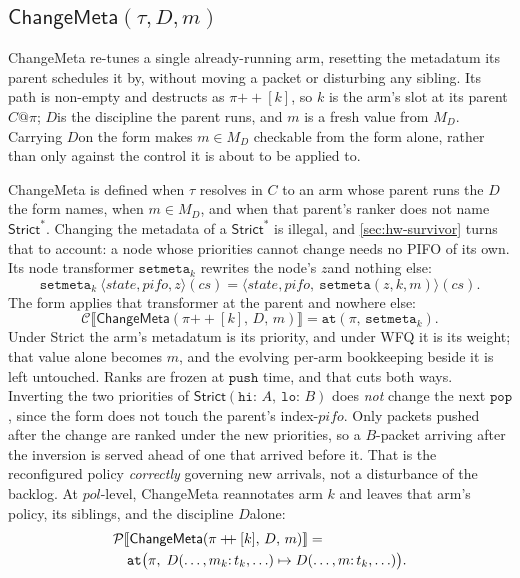 \documentclass[sigplan,anonymous,review,nonacm]{acmart}
\newcommand{\push}{\ensuremath{\mathtt{push}}}
\newcommand{\pop}{\ensuremath{\mathtt{pop}}}
\newcommand{\csem}[1]{\mathcal{C}\llbracket #1 \rrbracket}
\newcommand{\psem}[1]{\mathcal{P}\llbracket #1 \rrbracket}
\newcommand{\notation}[1]{\ensuremath{#1}\ifmmode\else\xspace\fi}
\newcommand{\pol}{\notation{\mathit{pol}}}
\newcommand{\pifo}{\notation{\mathit{pifo}}}
\newcommand{\zz}{\notation{\mathit{z}}}
\newcommand{\disc}{\notation{D}}
\newcommand{\Strict}{\textsf{Strict}}
\newcommand{\Strictstar}{\textsf{Strict}^{*}}
\newcommand{\WFQ}{\textsf{WFQ}}
\newcommand{\ChangeMeta}{\textsf{ChangeMeta}}
\begin{document}
\subsection{\texorpdfstring{\(\ChangeMeta(\tau, D, m)\)}{ChangeMeta}}\label{sec:changemeta}


\ChangeMeta{} re-tunes a single already-running arm, resetting the metadatum its parent schedules it by, without moving a packet or disturbing any sibling.
Its path is non-empty and destructs as \(\pi \mathbin{+\!\!+} [k]\), so \(k\) is the arm's slot at its parent \(C@\pi\); \disc is the discipline the parent runs, and \(m\) is a fresh value from \(M_{D}\).
Carrying \disc on the form makes \(m \in M_{D}\) checkable from the form alone, rather than only against the control it is about to be applied to.

\ChangeMeta{} is defined when \(\tau\) resolves in \(C\) to an arm whose parent runs the \disc the form names, when \(m \in M_{D}\), and when that parent's ranker does not name \(\Strictstar\).
Changing the metadata of a \(\Strictstar\) is illegal, and \cref{sec:hw-survivor} turns that to account: a node whose priorities cannot change needs no PIFO of its own.
Its node transformer \(\mathtt{setmeta}_k\) rewrites the node's \zz and nothing else:
{\small
\[
\mathtt{setmeta}_k\ \langle\mathit{state},\mathit{pifo},\mathit{z}\rangle(\mathit{cs}) = \langle\mathit{state},\mathit{pifo},\ \mathtt{setmeta}(\mathit{z},k,m)\rangle(\mathit{cs}).
\]
}
The form applies that transformer at the parent and nowhere else:
\[
\csem{\ChangeMeta(\pi \mathbin{+\!\!+} [k],\, D,\, m)} = \mathtt{at}(\pi,\, \mathtt{setmeta}_k).
\]
Under \Strict{} the arm's metadatum is its priority, and under \WFQ{} it is its weight; that value alone becomes \(m\), and the evolving per-arm bookkeeping beside it is left untouched.
Ranks are frozen at \push{} time, and that cuts both ways.
Inverting the two priorities of \(\Strict(\mathtt{hi}{:}\,A,\ \mathtt{lo}{:}\,B)\) does \emph{not} change the next \pop{}, since the form does not touch the parent's index-\pifo.
Only packets pushed after the change are ranked under the new priorities, so a \(B\)-packet arriving after the inversion is served ahead of one that arrived before it.
That is the reconfigured policy \emph{correctly} governing new arrivals, not a disturbance of the backlog.
At \pol-level, \ChangeMeta{} reannotates arm \(k\) and leaves that arm's policy, its siblings, and the discipline \disc alone:
\[
\begin{array}{@{}l@{}}
\psem{\ChangeMeta(\pi \mathbin{+\!\!+} [k],\, D,\, m)} =\\[3pt]
\quad \mathtt{at}\big(\pi,\; D(\ldots, m_k{:}\,t_k, \ldots) \mapsto D(\ldots, m{:}\,t_k, \ldots)\big).
\end{array}
\]
\end{document}
